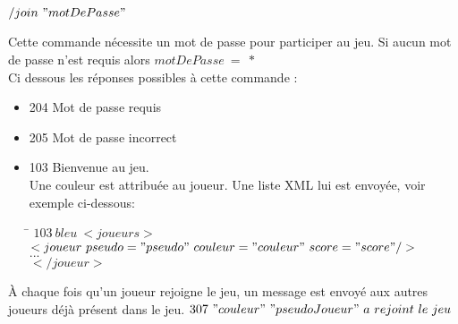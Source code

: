\par
$/join ~"motDePasse"$

\par
Cette commande nécessite un mot de passe pour participer au jeu. Si aucun mot de passe n'est requis alors $motDePasse ~ = ~ *$\\

Ci dessous les réponses possibles à cette commande :

\begin{itemize}
	\item 204 Mot de passe requis
	\item 205 Mot de passe incorrect
	\item 103 Bienvenue au jeu.\\
	Une couleur est attribuée au joueur. Une liste XML\label{xml} lui est envoyée, voir exemple ci-dessous:\\
\begin{tabbing}
\hspace{1cm}\=\kill
$103 ~ bleu ~ <joueurs>$ \\
 \> $<joueur ~ pseudo="pseudo" ~ couleur="couleur" ~ score="score" />$ \\
 \>	$...$ \\
$</joueur>$
\end{tabbing} 

\end{itemize}

À chaque fois qu'un joueur rejoigne le jeu, un message est envoyé aux autres joueurs déjà présent dans le jeu.
$307 ~ "couleur" ~ "pseudoJoueur" ~ a ~ rejoint ~ le ~ jeu$\\